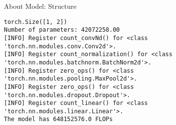 \begin{frame}[fragile]{About Model: Structure}
\tiny
{
\begin{verbatim}
torch.Size([1, 2])
Number of parameters: 42072258.00
[INFO] Register count_convNd() for <class 'torch.nn.modules.conv.Conv2d'>.
[INFO] Register count_normalization() for <class 'torch.nn.modules.batchnorm.BatchNorm2d'>.
[INFO] Register zero_ops() for <class 'torch.nn.modules.pooling.MaxPool2d'>.
[INFO] Register zero_ops() for <class 'torch.nn.modules.dropout.Dropout'>.
[INFO] Register count_linear() for <class 'torch.nn.modules.linear.Linear'>.
The model has 648152576.0 FLOPs
\end{verbatim}
}
\end{frame}
